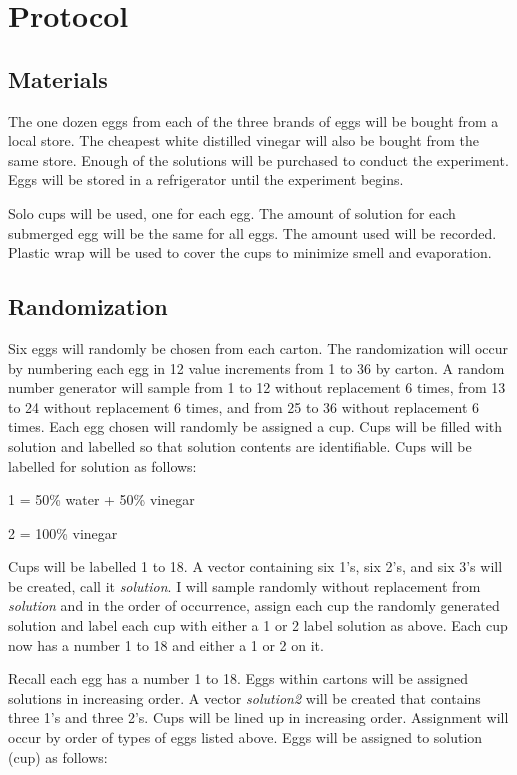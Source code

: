 \documentclass{article}\usepackage[]{graphicx}\usepackage[]{color}
\begin{document}
\section{Protocol}

\subsection{Materials}

The one dozen eggs from each of the three brands of eggs will be bought from a local store. The cheapest white distilled vinegar will also be bought from the same store. Enough of the solutions will be purchased to conduct the experiment. Eggs will be stored in a refrigerator until the experiment begins. 

Solo cups will be used, one for each egg. The amount of solution for each submerged egg will be the same for all eggs. The amount used will be recorded. Plastic wrap will be used to cover the cups to minimize smell and evaporation.

\subsection{Randomization}

Six eggs will randomly be chosen from each carton. The randomization will occur by numbering each egg in 12 value increments from 1 to 36 by carton. A random number generator will sample from 1 to 12 without replacement 6 times, from 13 to 24 without replacement 6 times, and from 25 to 36 without replacement 6 times. Each egg chosen will randomly be assigned a cup. Cups will be filled with solution and labelled so that solution contents are identifiable. Cups will be labelled for solution as follows:

1 = 50\% water + 50\% vinegar

2 = 100\% vinegar

Cups will be labelled 1 to 18. A vector containing six 1's, six 2's, and six 3's will be created, call it {\it solution}. I will sample randomly without replacement from {\it solution} and in the order of occurrence, assign each cup the randomly generated solution and label each cup with either a 1 or 2 label solution as above. Each cup now has a number 1 to 18 and either a 1 or 2 on it.

Recall each egg has a number 1 to 18. Eggs within cartons will be assigned solutions in increasing order. A vector {\it solution2} will be created that contains three 1's and three 2's. Cups will be lined up in increasing order. Assignment will occur by order of types of eggs listed above. Eggs will be assigned to solution (cup) as follows:
\end{document}
